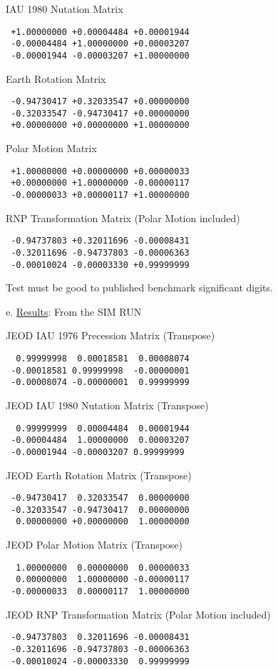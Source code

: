 IAU 1980 Nutation Matrix
\begin{verbatim}
 +1.00000000 +0.00004484 +0.00001944
 -0.00004484 +1.00000000 +0.00003207
 -0.00001944 -0.00003207 +1.00000000
\end{verbatim}

Earth Rotation Matrix
\begin{verbatim}
 -0.94730417 +0.32033547 +0.00000000
 -0.32033547 -0.94730417 +0.00000000
 +0.00000000 +0.00000000 +1.00000000
\end{verbatim}

Polar Motion Matrix
\begin{verbatim}
 +1.00000000 +0.00000000 +0.00000033
 +0.00000000 +1.00000000 -0.00000117
 -0.00000033 +0.00000117 +1.00000000
\end{verbatim}

RNP Transformation Matrix (Polar Motion included)
\begin{verbatim}
 -0.94737803 +0.32011696 -0.00008431
 -0.32011696 -0.94737803 -0.00006363
 -0.00010024 -0.00003330 +0.99999999
\end{verbatim}

Test must be good to published benchmark significant digits.

e. \underline{Results}:
From the SIM RUN

JEOD IAU 1976 Precession Matrix (Transpose)
\begin{verbatim}
  0.99999998  0.00018581  0.00008074
 -0.00018581 0.99999998  -0.00000001
 -0.00008074 -0.00000001  0.99999999
\end{verbatim}

JEOD IAU 1980 Nutation Matrix (Transpose)
\begin{verbatim}
  0.99999999  0.00004484  0.00001944
 -0.00004484  1.00000000  0.00003207
 -0.00001944 -0.00003207 0.99999999
\end{verbatim}

JEOD Earth Rotation Matrix (Transpose)
\begin{verbatim}
 -0.94730417  0.32033547  0.00000000
 -0.32033547 -0.94730417  0.00000000
  0.00000000 +0.00000000  1.00000000
\end{verbatim}

JEOD Polar Motion Matrix (Transpose)
\begin{verbatim}
  1.00000000  0.00000000  0.00000033
  0.00000000  1.00000000 -0.00000117
 -0.00000033  0.00000117  1.00000000
\end{verbatim}


JEOD RNP Transformation Matrix (Polar Motion included)
\begin{verbatim}
 -0.94737803  0.32011696 -0.00008431
 -0.32011696 -0.94737803 -0.00006363
 -0.00010024 -0.00003330  0.99999999
\end{verbatim}


